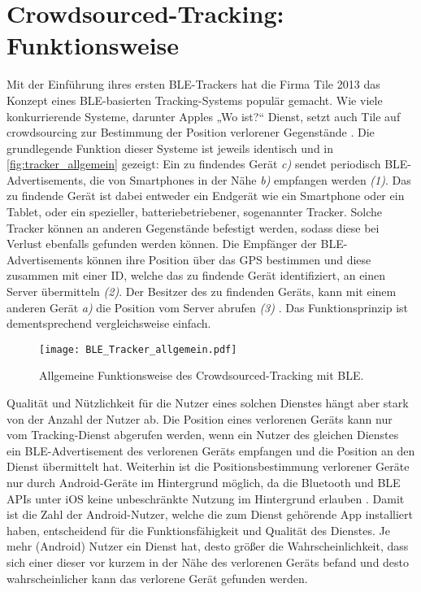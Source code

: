 \section{Crowdsourced-Tracking: Funktionsweise}
\label{sec:Funktionsweise}

Mit der Einführung ihres ersten \ac{BLE}-Trackers hat die Firma Tile 2013 das Konzept eines \ac{BLE}-basierten Tracking-Systems populär gemacht.
Wie viele konkurrierende Systeme, darunter Apples „Wo ist?“ Dienst, setzt auch Tile auf crowdsourcing zur Bestimmung der Position verlorener Gegenstände \cite{Weller_BLE_Finders}.
Die grundlegende Funktion dieser Systeme ist jeweils identisch und in \autoref{fig:tracker_allgemein} gezeigt: Ein zu findendes Gerät \textit{c)} sendet periodisch \ac{BLE}-Advertisements, die von Smartphones in der Nähe \textit{b)} empfangen werden \textit{(1)}.
Das zu findende Gerät ist dabei entweder ein Endgerät wie ein Smartphone oder ein Tablet, oder ein spezieller, batteriebetriebener, sogenannter Tracker.
Solche Tracker können an anderen Gegenstände befestigt werden, sodass diese bei Verlust ebenfalls gefunden werden können.
Die Empfänger der \ac{BLE}-Advertisements können ihre Position über das \ac{GPS} bestimmen und diese zusammen mit einer ID, welche das zu findende Gerät identifiziert, an einen Server übermitteln \textit{(2)}.
Der Besitzer des zu findenden Geräts, kann mit einem anderen Gerät \textit{a)} die Position vom Server abrufen \textit{(3)} \cite{Garg_Secure_Tracker}.
Das Funktionsprinzip ist dementsprechend vergleichsweise einfach.
\begin{figure}[ht]
    \centering 
    \texttt{[image: BLE\_Tracker\_allgemein.pdf]}
    \caption{Allgemeine Funktionsweise des Crowdsourced-Tracking mit \ac{BLE}.}
    \label{fig:tracker_allgemein}
\end{figure}
Qualität und Nützlichkeit für die Nutzer eines solchen Dienstes hängt aber stark von der Anzahl der Nutzer ab.
Die Position eines verlorenen Geräts kann nur vom Tracking-Dienst abgerufen werden, wenn ein Nutzer des gleichen Dienstes ein \ac{BLE}-Advertisement des verlorenen Geräts empfangen und die Position an den Dienst übermittelt hat.
Weiterhin ist die Positionsbestimmung verlorener Geräte nur durch Android-Geräte im Hintergrund möglich, da die Bluetooth und \ac{BLE} \acp{API} unter iOS keine unbeschränkte Nutzung im Hintergrund erlauben \cite{Heinrich_AirGuard}.
Damit ist die Zahl der Android-Nutzer, welche die zum Dienst gehörende App installiert haben, entscheidend für die Funktionsfähigkeit und Qualität des Dienstes. 
Je mehr (Android) Nutzer ein Dienst hat, desto größer die Wahrscheinlichkeit, dass sich einer dieser vor kurzem in der Nähe des verlorenen Geräts befand und desto wahrscheinlicher kann das verlorene Gerät gefunden werden.


